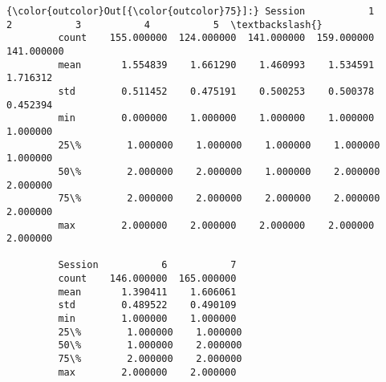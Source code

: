 \documentclass[11pt]{article}
\begin{document}
\begin{Verbatim}[commandchars=\\\{\}]
{\color{outcolor}Out[{\color{outcolor}75}]:} Session           1           2           3           4           5  \textbackslash{}
         count    155.000000  124.000000  141.000000  159.000000  141.000000   
         mean       1.554839    1.661290    1.460993    1.534591    1.716312   
         std        0.511452    0.475191    0.500253    0.500378    0.452394   
         min        0.000000    1.000000    1.000000    1.000000    1.000000   
         25\%        1.000000    1.000000    1.000000    1.000000    1.000000   
         50\%        2.000000    2.000000    1.000000    2.000000    2.000000   
         75\%        2.000000    2.000000    2.000000    2.000000    2.000000   
         max        2.000000    2.000000    2.000000    2.000000    2.000000   
         
         Session           6           7  
         count    146.000000  165.000000  
         mean       1.390411    1.606061  
         std        0.489522    0.490109  
         min        1.000000    1.000000  
         25\%        1.000000    1.000000  
         50\%        1.000000    2.000000  
         75\%        2.000000    2.000000  
         max        2.000000    2.000000  
\end{Verbatim}
            
\end{document}
